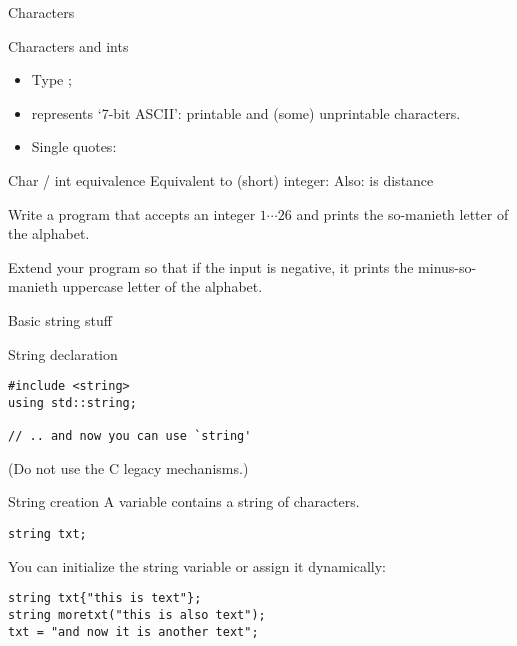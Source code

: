 
 {Characters}

\begin{block}{Characters and ints}
  \label{sl:chardef}
  \begin{itemize}
  \item Type ;
  \item represents `7-bit ASCII': printable and (some) unprintable
    characters.
  \item Single quotes: 
  \end{itemize}
\end{block}

\begin{block}{Char / int equivalence}
  \label{sl:int-char}
  Equivalent to (short) integer:
  Also:  is distance 
\end{block}

\begin{exercise}
  \label{ex:print-ichar}
  Write a program that accepts an integer $1\cdots26$ and prints the
  so-manieth letter of the alphabet.

  Extend your program so that if the input is negative, it prints the
  minus-so-manieth uppercase letter of the alphabet.
\end{exercise}

 {Basic string stuff}
\label{sec:string}

\begin{block}{String declaration}
  \label{sl:string-declare}
\begin{lstlisting}
#include <string>
using std::string;

// .. and now you can use `string'
\end{lstlisting}
(Do not use the C legacy mechanisms.)
\end{block}

\begin{block}{String creation}
  \label{sl:string-create}
  A  variable contains a string of characters.
\begin{verbatim}
string txt;
\end{verbatim}
You can initialize the string variable or assign it dynamically:
\begin{verbatim}
string txt{"this is text"};
string moretxt("this is also text");
txt = "and now it is another text";
\end{verbatim}
\end{block}

